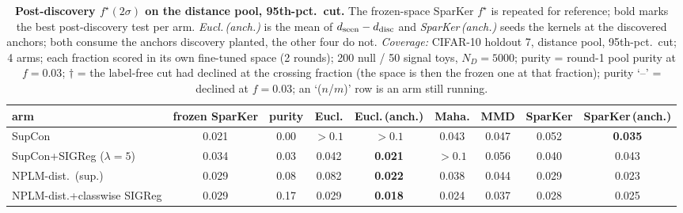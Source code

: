 \begin{table}[t]
\centering
\footnotesize
\begin{tabular}{lcccccccc}
\toprule
arm & frozen SparKer & purity & Eucl. & Eucl.\,(anch.) & Maha. & MMD & SparKer & SparKer\,(anch.) \\
\midrule
SupCon & 0.021 & 0.00 & $>0.1$ & $>0.1$ & 0.043 & 0.047 & 0.052 & \textbf{0.035} \\
\addlinespace
SupCon+SIGReg ($\lambda{=}5$) & 0.034 & 0.03 & 0.042 & \textbf{0.021} & $>0.1$ & 0.056 & 0.040 & 0.043 \\
\addlinespace
NPLM-dist.\ (sup.) & 0.029 & 0.08 & 0.082 & \textbf{0.022} & 0.038 & 0.044 & 0.029 & 0.023 \\
\addlinespace
NPLM-dist.+classwise SIGReg & 0.029 & 0.17 & 0.029 & \textbf{0.018} & 0.024 & 0.037 & 0.028 & 0.025 \\
\bottomrule
\end{tabular}
\caption{\textbf{Post-discovery $f^\star(2\sigma)$ on the distance pool, 95th-pct.\ cut.} The frozen-space SparKer $f^\star$ is repeated for reference; bold marks the best post-discovery test per arm. \emph{Eucl.\,(anch.)} is the mean of $d_{\rm seen}-d_{\rm disc}$ and \emph{SparKer\,(anch.)} seeds the kernels at the discovered anchors; both consume the anchors discovery planted, the other four do not. \emph{Coverage:} CIFAR-10 holdout 7, distance pool, 95th-pct.\ cut; 4 arms; each fraction scored in its own fine-tuned space (2 rounds); 200 null / 50 signal toys, $N_D{=}5000$; purity = round-1 pool purity at $f{=}0.03$; $\dagger$ = the label-free cut had declined at the crossing fraction (the space is then the frozen one at that fraction); purity `--' = declined at $f{=}0.03$; an `($n$/$m$)' row is an arm still running.}
\label{tab:sigma_post_cifar10_h7_quantile}
\end{table}
